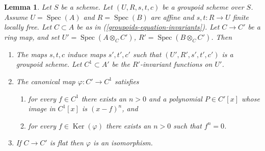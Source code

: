 \documentclass{amsart}
\theoremstyle{plain}
\newtheorem{lemma}[subsection]{Lemma}
\theoremstyle{definition}
\theoremstyle{remark}
\numberwithin{equation}{subsection}
\def\Spec{\mathop{\mathrm{Spec}}}
\def\Ker{\mathop{\mathrm{Ker}}}
\begin{document}
\begin{lemma}
\label{groupoids-lemma-invariants-base-change}
Let $S$ be a scheme. Let $(U, R, s, t, c)$ be a groupoid scheme over $S$.
Assume $U = \Spec(A)$ and $R = \Spec(B)$ are affine and
$s, t : R \to U$ finite locally free. Let $C \subset A$ be as in
(\ref{groupoids-equation-invariants}). Let $C \to C'$ be a ring map, and set
$U' = \Spec(A \otimes_C C')$,
$R' = \Spec(B \otimes_C C')$.
Then
\begin{enumerate}
\item The maps $s, t, c$ induce maps $s', t', c'$ such that
$(U', R', s', t', c')$ is a groupoid scheme. Let $C^1 \subset A'$
be the $R'$-invariant functions on $U'$.
\item The canonical map $\varphi : C' \to C^1$ satisfies
\begin{enumerate}
\item for every $f \in C^1$ there exists an $n > 0$ and a
polynomial $P \in C'[x]$ whose image in $C^1[x]$ is
$(x - f)^n$, and
\item for every $f \in \Ker(\varphi)$ there exists
an $n > 0$ such that $f^n = 0$.
\end{enumerate}
\item If $C \to C'$ is flat then $\varphi$ is an isomorphism.
\end{enumerate}
\end{lemma}
\end{document}
